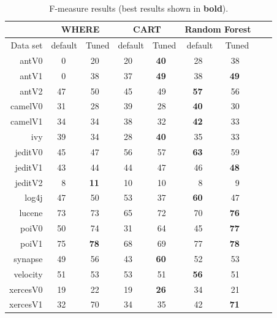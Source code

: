 \documentclass[smallextended]{svjour3}
\begin{document}
\begin{table}[!t]
\renewcommand{\baselinestretch}{0.8} 
\scriptsize  
~~~\begin{tabular}{r|rl|rl|rl|rl|rl|rlrl}
      &   \multicolumn{4}{c|}{WHERE}         &   \multicolumn{4}{c|}{CART}         &   \multicolumn{4}{c}{Random Forest}         \\\hline
  Data set   &   \multicolumn{2}{c}{default}         &   \multicolumn{2}{c|}{Tuned}         &   \multicolumn{2}{c}{default}         &   \multicolumn{2}{c|}{Tuned}    &   \multicolumn{2}{c}{default}  &   \multicolumn{2}{c}{Tuned}\\\hline
antV0 & 0 &   & 20 &   & 20 &   & {\bf 40} &   & 28 &   & 38 &  \\
antV1 & 0 &   & 38 &   & 37 &   & {\bf 49} &   & 38 &   & {\bf 49} &  \\
antV2 & 47 &   & 50 &   & 45 &   &  49 &   & {\bf 57} &   & 56 &  \\
camelV0 & 31 &   & 28 &   & 39 &   & 28 &   & {\bf 40} &   & 30 &  \\
camelV1 & 34 &   & 34 &   & 38 &   & 32 &   & {\bf 42} &   & 33 &  \\
ivy & 39 &   & 34 &   & 28 &   & {\bf 40} &   & 35 &   &  33 &  \\
jeditV0 & 45 &   & 47 &   & 56 &   & 57 &   & {\bf 63} &   & 59 &  \\
jeditV1 & 43 &   & 44 &   & 44 &   & 47 &   & 46 &   & {\bf 48} &  \\
jeditV2 & 8 &   & {\bf 11} &   & 10 &   & 10 &   & 8 &   & 9 &  \\
log4j & 47 &   & 50 &   & 53 &   & 37 &   & {\bf 60} &   & 47 &  \\
lucene & 73 &   & 73 &   & 65 &   & 72 &   & 70 &   & {\bf 76} &  \\
poiV0 & 50 &   & 74 &   & 31 &   & 64 &   & 45 &   & {\bf 77} &  \\
poiV1 & 75 &   & {\bf 78} &   & 68 &   & 69 &   & 77 &   & {\bf 78} &  \\
synapse & 49 &   & 56 &   & 43 &   & {\bf 60} &   & 52 &   & 53 &  \\
velocity & 51 &   & 53 &   & 53 &   & 51 &   & {\bf 56} &   & 51 &  \\
xercesV0 & 19 &   & 22 &   & 19 &   & {\bf 26} &   & 34 &   & 21 &  \\
xercesV1 & 32 &   & 70 &   & 34 &   & 35 &   & 42 &   & {\bf 71} &  \\
\end{tabular}
\caption{F-measure results (best results  shown in {\bf bold}).}
\label{tab:fbars}
\end{table}
\end{document}
